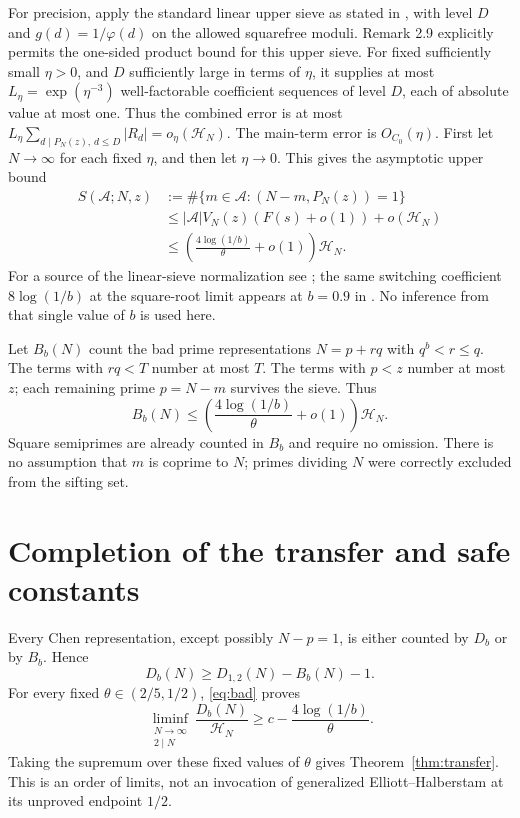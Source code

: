 \documentclass[11pt]{article}
\newcommand{\HN}{\mathcal H_N}
\begin{document}
For precision, apply the standard linear upper sieve as stated in
\cite[Theorem 2.10 and Remark 2.9]{Lichtman2025}, with level $D$ and
$g(d)=1/\varphi(d)$ on the allowed squarefree moduli. Remark 2.9
explicitly permits the one-sided product bound for this upper sieve.
For fixed sufficiently small $\eta>0$, and $D$ sufficiently large in
terms of $\eta$, it supplies at most $L_\eta=\exp(\eta^{-3})$
well-factorable coefficient sequences of level $D$, each of absolute
value at most one. Thus the combined error is at most
$L_\eta\sum_{d\mid P_N(z),\,d\le D}|R_d|=o_\eta(\HN)$.
The main-term error is $O_{C_0}(\eta)$.
First let $N\to\infty$ for each fixed $\eta$, and then let
$\eta\to0$. This gives the asymptotic upper bound
\begin{align*}
 S(\mathcal A;N,z)
 &:=\#\{m\in\mathcal A:(N-m,P_N(z))=1\}\\
 &\le |\mathcal A|V_N(z)(F(s)+o(1))+o(\HN)\\
 &\le\left(\frac{4\log(1/b)}{\theta}+o(1)\right)\HN.
\end{align*}
For a source of the linear-sieve normalization see
\cite[Section 1, equations (1.4) and (3.2)]{Wu2008}; the same
switching coefficient $8\log(1/b)$ at the square-root limit appears
at $b=0.9$ in \cite[equations (5.36)--(5.43)]{LiLiu2026}.
No inference from that single value of $b$ is used here.

Let $B_b(N)$ count the bad prime representations $N=p+rq$ with
$q^b<r\le q$. The terms with $rq<T$ number at most $T$.
The terms with $p<z$ number at most $z$; each remaining prime $p=N-m$
survives the sieve. Thus
\begin{equation}\label{eq:bad}
 B_b(N)\le
 \left(\frac{4\log(1/b)}{\theta}+o(1)\right)\HN.
\end{equation}
Square semiprimes are already counted in $B_b$ and require no omission.
There is no assumption that $m$ is coprime to $N$; primes dividing $N$
were correctly excluded from the sifting set.

\section{Completion of the transfer and safe constants}
Every Chen representation, except possibly $N-p=1$, is either counted
by $D_b$ or by $B_b$. Hence
\[
 D_b(N)\ge D_{1,2}(N)-B_b(N)-1.
\]
For every fixed $\theta\in(2/5,1/2)$, \eqref{eq:bad} proves
\[
 \liminf_{\substack{N\to\infty\\2\mid N}}\frac{D_b(N)}{\HN}
 \ge c-\frac{4\log(1/b)}{\theta}.
\]
Taking the supremum over these fixed values of $\theta$ gives
Theorem~\ref{thm:transfer}. This is an order of limits, not an invocation
of generalized Elliott--Halberstam at its unproved endpoint $1/2$.
\end{document}
